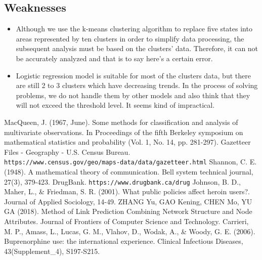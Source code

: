 \documentclass[12pt]{article}
\begin{document}
\subsection{Weaknesses}
\begin{itemize}
	\item Although we use the k-means clustering algorithm to replace five states into areas represented by ten clusters in order to simplify data processing, the subsequent analysis must be based on the clusters’ data. Therefore, it can not be accurately analyzed and that is to say here’s a certain error.
	\item Logistic regression model is suitable for most of the clusters data, but there are still 2 to 3 clusters which have decreasing trends. In the process of solving problems, we do not handle them by other models and also think that they will not exceed the threshold level. It seems kind of impractical.
 \end{itemize}

\begin{thebibliography}{99}

MacQueen, J. (1967, June). Some methods for classification and analysis of multivariate observations. In Proceedings of the fifth Berkeley symposium on mathematical statistics and probability (Vol. 1, No. 14, pp. 281-297).
Gazetteer Files - Geography - U.S. Census Bureau. \texttt{\\https://www.census.gov/geo/maps-data/data/gazetteer.html}
Shannon, C. E. (1948). A mathematical theory of communication. Bell system technical journal, 27(3), 379-423.
DrugBank. \texttt{https://www.drugbank.ca/drug}
Johnson, B. D., Maher, L., \& Friedman, S. R. (2001). What public policies affect heroin users?. Journal of Applied Sociology, 14-49.
ZHANG Yu, GAO Kening, CHEN Mo, YU GA (2018). Method of Link Prediction Combining Network Structure and Node Attributes. Journal of Frontiers of Computer Science and Technology.
Carrieri, M. P., Amass, L., Lucas, G. M., Vlahov, D., Wodak, A., \& Woody, G. E. (2006). Buprenorphine use: the international experience. Clinical Infectious Diseases, 43(Supplement\_4), S197-S215.

\end{thebibliography}
\end{document}
